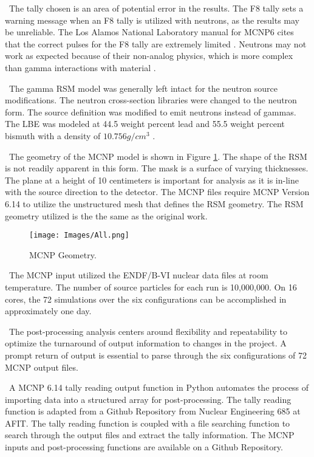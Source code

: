 \documentclass[journal]{IEEEtran}
\let\MYoriglatexcaption\caption
\renewcommand{\caption}[2][\relax]{\MYoriglatexcaption[#2]{#2}}
\begin{document}
	\ The tally chosen is an area of potential error in the results.  The F8 tally sets a warning message when an F8 tally is utilized with neutrons, as the results may be unreliable.  The Los Alamos National Laboratory manual for MCNP6 cites that the correct pulses for the F8 tally are extremely limited \cite{MCNP6}. Neutrons may not work as expected because of their non-analog physics, which is more complex than gamma interactions with material \cite{MCNP6}. 
	
	\ The gamma RSM model was generally left intact for the neutron source modifications.  The neutron cross-section libraries were changed to the neutron form.  The source definition was modified to emit neutrons instead of gammas. The LBE was modeled at 44.5 weight percent lead and 55.5 weight percent bismuth with a density of $ 10.756 g/cm^3$ \cite{LBE}. 
	
	\ The geometry of the MCNP model is shown in Figure \ref{fig:geometry}.  The shape of the RSM is not readily apparent in this form.  The mask is a surface of varying thicknesses.  The plane at a height of 10 centimeters is important for analysis as it is in-line with the source direction to the detector.  The MCNP files require MCNP Version 6.14 to utilize the unstructured mesh that defines the RSM geometry.  The RSM geometry utilized is the the same as the original work. 
	
	\begin{figure}[ht]
		\texttt{[image: Images/All.png]}
		\caption{MCNP Geometry.}
		\label{fig:geometry}
	\end{figure}
    
    \ The MCNP input utilized the ENDF/B-VI nuclear data files at room temperature.  The number of source particles for each run is 10,000,000.  On 16 cores, the 72 simulations over the six configurations can be accomplished in approximately one day. 
    
    \ The post-processing analysis centers around flexibility and repeatability to optimize the turnaround of output information to changes in the project.  A prompt return of output is essential to parse through the six configurations of 72 MCNP output files.  
    
    \ A MCNP 6.14 tally reading output function in Python automates the process of importing data into a structured array for post-processing.  The tally reading function is adapted from a Github Repository from Nuclear Engineering 685 at AFIT\cite{N685}. The tally reading function is coupled with a file searching function to search through the output files and extract the tally information.  The MCNP inputs and post-processing functions are available on a Github Repository\cite{RSMcode}. 
   
\end{document}
